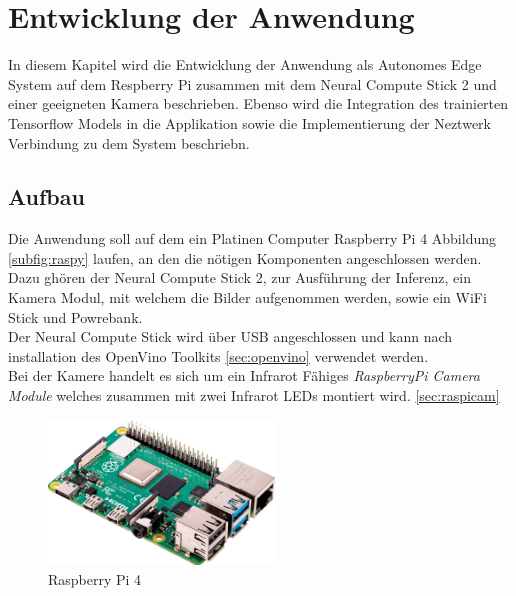 
\chapter{Entwicklung der Anwendung}\label{kap:application}

In diesem Kapitel wird die Entwicklung der Anwendung als Autonomes 
Edge System auf dem Respberry Pi zusammen mit dem Neural Compute 
Stick 2 und einer geeigneten Kamera beschrieben.
Ebenso wird die Integration des trainierten Tensorflow Models in die  
Applikation sowie die Implementierung der Neztwerk Verbindung zu dem 
System beschriebn.




\section{Aufbau}\label{sec:aufbau}


Die Anwendung soll auf dem ein Platinen Computer Raspberry 
Pi 4 Abbildung \ref{subfig:raspy} 
laufen, an den die nötigen Komponenten angeschlossen werden. Dazu 
ghören der Neural Compute Stick 2, zur Ausführung der Inferenz, ein 
Kamera Modul, mit welchem die Bilder aufgenommen werden, sowie ein 
WiFi Stick und Powrebank.
\\
Der Neural Compute Stick wird über USB angeschlossen und kann 
nach installation des OpenVino Toolkits \ref{sec:openvino}
 verwendet werden.
\\
Bei der Kamere handelt es sich um ein Infrarot Fähiges \textit{RaspberryPi 
Camera Module} welches zusammen mit zwei Infrarot 
LEDs montiert wird. \ref{sec:raspicam}


\begin{figure}[htb]
    \centering
    \includegraphics[width=6cm]{./Bilder/raspberrypi_4.png}
    \caption{Raspberry Pi 4}
    \label{img:raspberrypi}
\end{figure}

